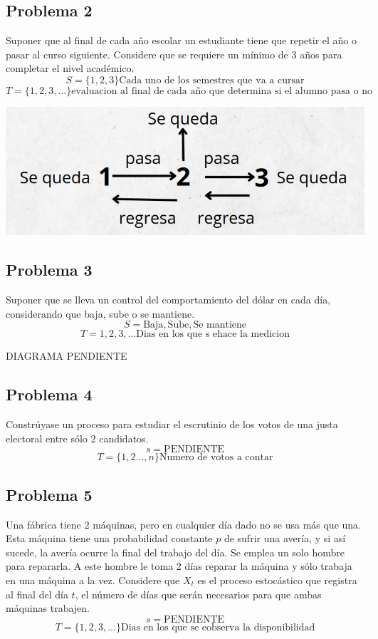 \documentclass{article}
\begin{document}
\subsection*{Problema 2}
Suponer que al final de cada año escolar un estudiante tiene que repetir el año o pasar al curso siguiente. Considere que se requiere un mínimo de 3 años para completar el nivel académico.
\[ S = \{1,2,3\} \text{Cada uno de los semestres que va a cursar}\]
\[T = \{1,2,3,\dots\}\text{evaluacion al final de cada año que determina si el alumno pasa o no}\]
\begin{center}
    \includegraphics[width=0.6\linewidth]{./imagenes/image2.png}
\end{center}
\subsection*{Problema 3}

Suponer que se lleva un control del comportamiento del dólar en cada día, considerando que baja, sube o se mantiene.
\[S = {\text{Baja}, \text{Sube}, \text{Se mantiene}}\]
\[T = {1,2,3,\dots} \text{Dias en los que s ehace la medicion}\]

DIAGRAMA PENDIENTE
\subsection*{Problema 4}

Constrúyase un proceso para estudiar el escrutinio de los votos de una justa electoral entre sólo 2 candidatos.
\[s = {} \text{PENDIENTE}\]
\[T = \{1,2\dots, n\} \text{Numero de votos a contar}\]
\subsection*{Problema 5}

Una fábrica tiene 2 máquinas, pero en cualquier día dado no se usa más que una. Esta máquina tiene una probabilidad constante \( p \) de sufrir una avería, y si así sucede, la avería ocurre la final del trabajo del día. Se emplea un solo hombre para repararla. A este hombre le toma 2 días reparar la máquina y sólo trabaja en una máquina a la vez. Considere que \( X_t \) es el proceso estocástico que registra al final del día \( t \), el número de días que serán necesarios para que ambas máquinas trabajen.
\[s = {} \text{PENDIENTE}\]
\[T = \{1,2,3,\dots\} \text{Dias en los que se eobserva la disponibilidad}\]
\end{document}
